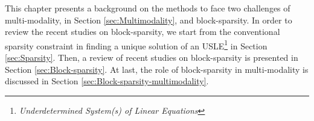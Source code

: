 This chapter presents a background on the methods to face 
two challenges
of multi-modality, in Section \ref{sec:Multimodality}, and block-sparsity.
In order to review the recent studies on block-sparsity, we start from the conventional sparsity constraint in finding a unique solution of an USLE\footnote{\emph{Underdetermined System(s) of Linear Equations}} in Section \ref{sec:Sparsity}.
Then, a review of recent studies on block-sparsity is presented in Section \ref{sec:Block-sparsity}.
At last, the role of block-sparsity in multi-modality is discussed in Section \ref{sec:Block-sparsity-multimodality}.